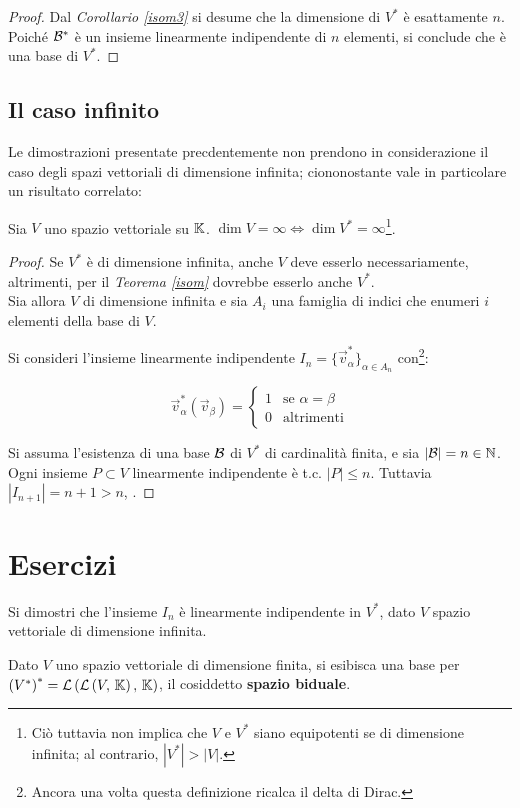 \documentclass[a4paper]{article}
\newcommand{\dual}[1]{#1^{*}}
\begin{document}
\begin{proof}
Dal \textit{Corollario \ref{isom3}} si desume che la dimensione
di $\dual V$ è esattamente $n$. Poiché $\dual \BB$ è un insieme
linearmente indipendente di $n$ elementi, si conclude
che è una base di $\dual V$.
\end{proof}

\subsection{Il caso infinito}

Le dimostrazioni presentate precdentemente non prendono in considerazione
il caso degli spazi vettoriali di dimensione infinita;
ciononostante vale in particolare un risultato correlato:

\vskip 10pt

\begin{theorem} Sia $V$ uno spazio vettoriale su $\mathbb{K}$.
$\dim V = \infty \iff \dim \dual V = \infty$\footnote{Ciò
tuttavia non implica che $V$ e $\dual V$ siano equipotenti se di dimensione infinita; al contrario, $| \dual V | > |V|$.}.
\end{theorem}

\begin{proof}
Se $\dual V$ è di dimensione infinita, anche $V$ deve esserlo
necessariamente, altrimenti, per il \textit{Teorema \ref{isom}}
dovrebbe esserlo anche $\dual V$. \\

Sia allora $V$ di dimensione infinita e sia $A_i$ una famiglia
di indici che enumeri $i$ elementi della base di $V$.

Si consideri l'insieme linearmente indipendente $I_n = \{\vec v_{\alpha}^* \}_{\alpha \in A_n}$ con\footnote{Ancora una volta
questa definizione ricalca il delta di Dirac.}:

\[\vec v_{\alpha}^*\left(\vec v_{\beta}\right) = \begin{cases}1 & \text{se } \alpha = \beta \\ 0 & \text{altrimenti} \end{cases}\]

Si assuma l'esistenza di una base $\mathcal{B}$ di $\dual V$ di
cardinalità finita, e sia $| \mathcal{B} | = n \in \mathbb{N}$. Ogni insieme $P \subset V$ linearmente indipendente è t.c. $|P| \leq n$.
Tuttavia $|I_{n+1}|=n+1>n$, \Lightning.

\end{proof}

\section{Esercizi}

\begin{exercise}
Si dimostri che l'insieme $I_n$ è linearmente indipendente in $\dual V$, dato $V$ spazio vettoriale di dimensione infinita.
\end{exercise}

\begin{exercise}
Dato $V$ uno spazio vettoriale di dimensione finita, si esibisca
una base per $\dual {\left( \dual V \right)} = \LL{\LL{V}{ \KK}}{\KK}$, il cosiddetto \textbf{spazio biduale}.
\end{exercise}
\end{document}
